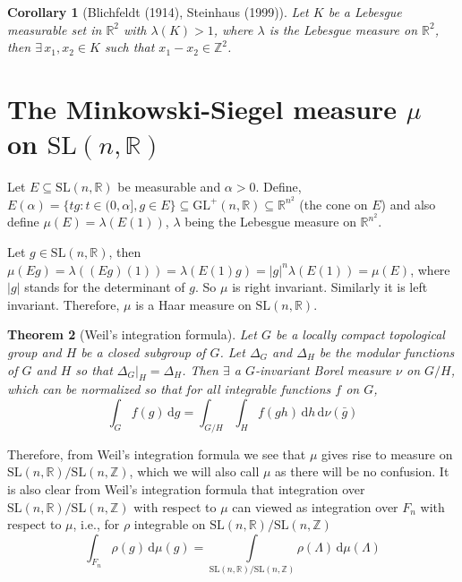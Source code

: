 \documentclass[11pt]{article}
\newtheorem{theorem}{Theorem}[section]
\newtheorem{corollary}[theorem]{Corollary}
\theoremstyle{definition}
\begin{document}
\begin{corollary}[Blichfeldt (1914), Steinhaus (1999)]\label{cor1}
    Let $K$ be a Lebesgue measurable set in $\mathbb{R}^2$ with $ \lambda (K) > 1$, where $\lambda$ is the Lebesgue measure on $\mathbb{R}^2$, then $\exists \, x_1 , x_2 \in K$ such that $x_1 - x_2 \in \mathbb{Z}^2$.
\end{corollary}

\section{The Minkowski-Siegel measure $\mu$ on $\mathrm{SL}(n, \mathbb{R})$}
Let $E \subseteq \mathrm{SL}(n,  \mathbb{R})$ be measurable and $\alpha > 0$.
Define, $E(\alpha )= \{tg: t \in (0,\alpha ], g \in E\} \subseteq \mathrm{GL}^+(n, \mathbb{R}) \subseteq \mathbb{R}^{n^2}$ (the cone on $E$) and also define $ \mu (E) = \lambda (E(1))$, $\lambda$ being the Lebesgue measure on $\mathbb{R}^{n^2}$.

Let $g\in \mathrm{SL}(n,  \mathbb{R})$, then $\mu (Eg)= \lambda ((Eg)(1))=\lambda (E(1)g)=|g|^n \lambda (E(1))= \mu (E)$, where $|g|$ stands for the determinant of $g$.
So $\mu$ is right invariant.
Similarly it is left invariant.
Therefore, $\mu$ is a Haar measure on $\mathrm{SL}(n,\mathbb{R})$.

\begin{theorem}[Weil's integration formula]\label{thm}
    Let $G$ be a locally compact topological group and $H$ be a closed subgroup of $G$.
    Let $\Delta_G$ and $\Delta _H$ be the modular functions of $G$ and $H$ so that $\Delta _G\big|_H = \Delta _H$.
    Then $\exists$ a $G$-invariant Borel measure $\nu$ on $G/H$, which can be normalized so that for all integrable functions $f$ on $G$,
    \[
        \int_{G} f(g) \, \mathrm{d} g = \int_{G/H}\int_{H} f(gh) \, \mathrm{d} h \, \mathrm{d} \nu (\bar{g})
    \]

\end{theorem}

Therefore, from Weil's integration formula we see that $\mu$ gives rise to measure on $\mathrm{SL}(n,\mathbb{R})/\mathrm{SL}(n,\mathbb{Z})$, which we will also call $\mu$ as there will be no confusion.
It is also clear from Weil's integration formula that integration over $\mathrm{SL}(n,\mathbb{R})/\mathrm{SL}(n,\mathbb{Z})$ with respect to $\mu$ can viewed as integration over $F_n$ with respect to $\mu$, i.e., for $\rho $ integrable on $\mathrm{SL}(n,\mathbb{R})/\mathrm{SL}(n,\mathbb{Z})$
\[
    \int_{F_n} \rho (g) \, \mathrm{d} \mu (g) = \int\limits_{\mathrm{SL}(n,\mathbb{R})/\mathrm{SL}(n,\mathbb{Z})} \rho (\Lambda ) \, \mathrm{d} \mu (\Lambda )
\]
\end{document}
